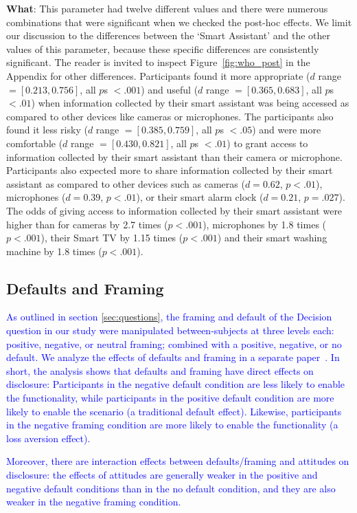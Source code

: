\textbf{What}: This parameter had twelve different values and there were numerous combinations that were significant when we checked the post-hoc effects. We limit our discussion to the differences between the `Smart Assistant' and the other values of this parameter, because these specific differences are consistently significant. The reader is invited to inspect Figure~\ref{fig:who_post} in the Appendix for other differences. Participants found it more appropriate ($d$ range $= [0.213, 0.756]$, all $p$s $< .001$) and useful ($d$ range $= [0.365, 0.683]$, all $p$s $< .01$) when information collected by their smart assistant was being accessed as compared to other devices like cameras or microphones. The participants also found it less risky ($d$ range $= [0.385, 0.759]$, all $p$s $< .05$) and were more comfortable ($d$ range $= [0.430,0.821]$, all $p$s $< .01$) to grant access to information collected by their smart assistant than their camera or microphone. Participants also expected more to share information collected by their smart assistant as compared to other devices such as cameras ($d = 0.62$, $p < .01$), microphones ($d = 0.39$, $p < .01$), or their smart alarm clock ($d = 0.21$, $p = .027$). The odds of giving access to information collected by their smart assistant were higher than for cameras by 2.7 times ($p < .001$), microphones by 1.8 times ($p < .001$), their Smart TV by 1.15 times ($p < .001$) and their smart washing machine by 1.8 times ($p < .001$).

\subsection{Defaults and Framing}
\textcolor{blue}{As outlined in section \ref{sec:questions}, the framing and default of the Decision question in our study were manipulated between-subjects at three levels each: positive, negative, or neutral framing; combined with a positive, negative, or no default. We analyze the effects of defaults and framing in a separate paper~\cite{bahirat_exploring_2018}. In short, the analysis shows that defaults and framing have direct effects on disclosure: Participants in the negative default condition are less likely to enable the functionality, while participants in the positive default condition are more likely to enable the scenario (a traditional default effect). Likewise, participants in the negative framing condition are more likely to enable the functionality (a loss aversion effect).}

\textcolor{blue}{Moreover, there are interaction effects between defaults/framing and attitudes on disclosure: the effects of attitudes are generally weaker in the positive and negative default conditions than in the no default condition, and they are also weaker in the negative framing condition.}

